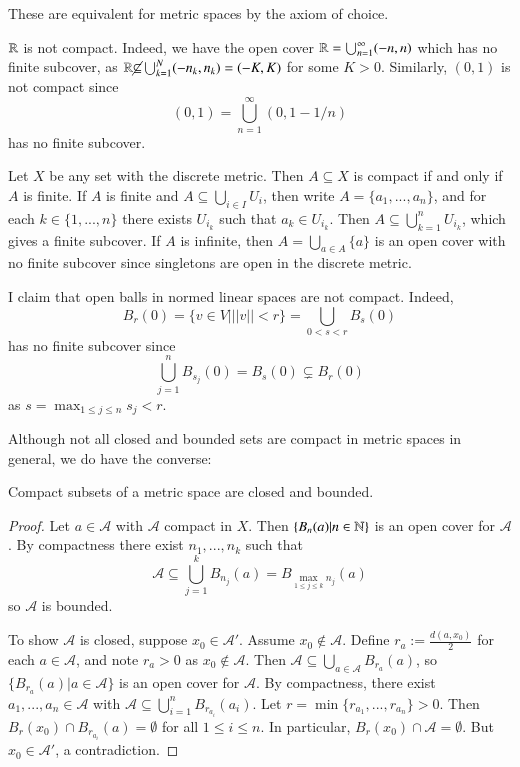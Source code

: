 These are equivalent for metric spaces by the axiom of choice.

\begin{eg}
    $\mathbb R$ is not compact. Indeed, we have the open cover $\mathbb R = \bigcup_{n=1}^{\infty}(-n,n)$ which has no finite subcover, as $\mathbb R \cancel{\subseteq} \bigcup_{k=1}^N(-n_k,n_k) = (-K,K)$ for some $K > 0$. Similarly, $(0,1)$ is not compact since $$(0,1) = \bigcup_{n=1}^{\infty}(0,1-1/n)$$ has no finite subcover.
\end{eg}

\begin{eg}
    Let $X$ be any set with the discrete metric. Then $A \subseteq X$ is compact if and only if $A$ is finite. If $A$ is finite and $A \subseteq \bigcup_{i \in I}U_i$, then write $A = \{a_1,...,a_n\}$, and for each $k \in \{1,...,n\}$ there exists $U_{i_k}$ such that $a_k \in U_{i_k}$. Then $A \subseteq \bigcup_{k=1}^nU_{i_k}$, which gives a finite subcover. If $A$ is infinite, then $A = \bigcup_{a \in A}\{a\}$ is an open cover with no finite subcover since singletons are open in the discrete metric.
\end{eg}

\begin{eg}
    I claim that open balls in normed linear spaces are not compact. Indeed, $$B_r(0) = \{v \in V\vert ||v|| < r\} = \bigcup_{0 < s < r}B_s(0)$$ has no finite subcover since $$\bigcup_{j=1}^nB_{s_j}(0) = B_s(0) \subsetneq B_r(0)$$ as $s = \max_{1\leq j \leq n}s_j < r$.
\end{eg}

Although not all closed and bounded sets are compact in metric spaces in general, we do have the converse:

\begin{prop}
    Compact subsets of a metric space are closed and bounded.
\end{prop}
\begin{proof}
     Let $a \in \mathcal{A}$ with $\mathcal{A}$ compact in $X$. Then $\{B_n(a)\vert n \in \mathbb N\}$ is an open cover for $\mathcal{A}$. By compactness there exist $n_1,...,n_k$ such that $$\mathcal{A} \subseteq \bigcup_{j=1}^kB_{n_j}(a) = B_{\max_{1\leq j \leq k}n_j}(a)$$ so $\mathcal{A}$ is bounded.

     To show $\mathcal{A}$ is closed, suppose $x_0 \in \mathcal{A}'$. Assume $x_0 \notin \mathcal{A}$. Define $r_a := \frac{d(a,x_0)}{2}$ for each $a \in \mathcal{A}$, and note $r_a > 0$ as $x_0 \notin \mathcal{A}$. Then $\mathcal{A} \subseteq \bigcup_{a \in \mathcal{A}}B_{r_a}(a)$, so $\{B_{r_a}(a)\vert a \in \mathcal{A}\}$ is an open cover for $\mathcal{A}$. By compactness, there exist $a_1,...,a_n \in \mathcal{A}$ with $\mathcal{A} \subseteq \bigcup_{i=1}^nB_{r_{a_i}}(a_i)$. Let $r = \min\{r_{a_1},...,r_{a_n}\} > 0$. Then $B_r(x_0) \cap B_{r_{a_i}}(a) = \emptyset$ for all $1 \leq i \leq n$. In particular, $B_r(x_0) \cap \mathcal{A} = \emptyset$. But $x_0 \in \mathcal{A}'$, a contradiction.
\end{proof}

